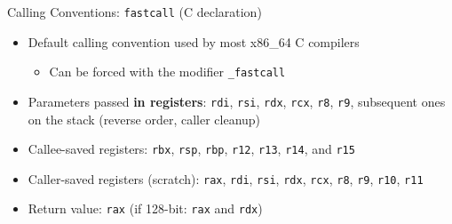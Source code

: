 \documentclass[]{beamer}
\begin{document}

\begin{frame}{Calling Conventions: {\tt fastcall} (C declaration)}
  \begin{itemize}
  \item Default calling convention used by most x86\_64 C compilers
  \begin{itemize}
  	\item Can be forced with the modifier \alert{\tt \_fastcall}
  \end{itemize}
  \item Parameters passed {\bf in registers}: {\tt rdi}, {\tt rsi}, {\tt rdx}, {\tt rcx}, {\tt r8}, {\tt r9}, subsequent ones on the stack (reverse order, caller cleanup)
  \item Callee-saved registers: {\tt rbx}, {\tt rsp}, {\tt rbp}, {\tt r12}, {\tt r13}, {\tt r14}, and {\tt r15}
  \item Caller-saved registers (scratch): {\tt rax}, {\tt rdi}, {\tt rsi}, {\tt rdx}, {\tt rcx}, {\tt r8}, {\tt r9}, {\tt r10}, {\tt r11}
  \item Return value: {\tt rax} (if 128-bit: {\tt rax} and {\tt rdx})
  \end{itemize}
\end{frame}
\end{document}
